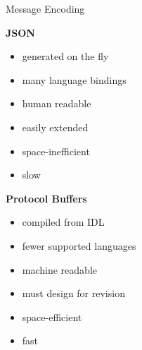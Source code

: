 \documentclass[default,pdf,colorBG,slideColor]{prosper}
\begin{document}
\begin{slide}{Message Encoding}{\small
  \hfill
  \begin{minipage}{0.5\textwidth}
  {\bf JSON}
  \begin{itemize}
    \item{generated on the fly}
    \item{many language bindings}
    \item{human readable}
    \item{easily extended}
    \item{space-inefficient}
    \item{slow}
  \end{itemize}
  \end{minipage}
  \hfill
  \begin{minipage}{0.45\textwidth}
  {\bf Protocol Buffers}
  \begin{itemize}
    \item{compiled from IDL}
    \item{fewer supported languages}
    \item{machine readable}
    \item{must design for revision}
    \item{space-efficient}
    \item{fast}
  \end{itemize}
  \end{minipage}
  \hfill
}\end{slide}
\end{document}
